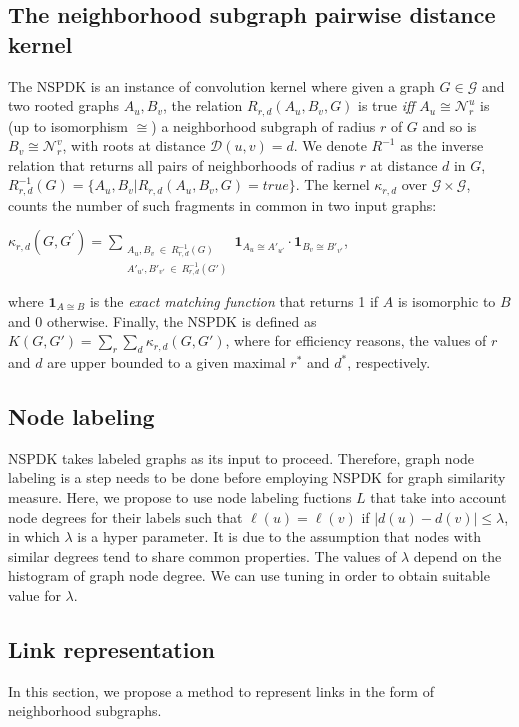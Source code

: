 \documentclass[runningheads,a4paper]{llncs}
\begin{document}
\subsection{The neighborhood subgraph pairwise distance kernel}
The NSPDK \cite{nspdk} is an instance of convolution kernel \cite{convolution-kernel} where given a graph $G \in \mathcal{G}$ and two rooted graphs $A_u, B_v$, the relation $R_{r,d}(A_u, B_v, G)$ is true {\em iff} $A_u \cong \mathcal{N}_r^u$ is (up to isomorphism $\cong$) a neighborhood subgraph of radius $r$ of $G$ and so is $B_v \cong  \mathcal{N}_r^v$, with roots at distance $\mathcal{D}(u,v)= d$. We denote $R^{-1}$ as the inverse relation that returns all pairs of neighborhoods of radius $r$ at distance $d$ in $G$, $R^{-1}_{r,d}(G) = \lbrace A_u, B_v | R_{r,d}(A_u,B_v,G)=true\rbrace$. The kernel $\kappa_{r,d}$ over $\mathcal{G} \times \mathcal{G}$, counts the number of such fragments in common in two input graphs: 
\begin{center}
$\kappa_{r,d}(G,G^{'}) = 
\!\!\!\!\!\!\!\!\!\!\!\! 
\sum\limits_{\substack{A_u, B_v \ \in \ R_{r,d}^{-1}(G) \\ 
{A'}_{u'}, {B'}_{v'} \ \in \ R_{r,d}^{-1}(G')
}} \!\!\!\!\!\!\!\!\!\!\!\!  { { \textbf{1}_{A_{u} \cong A'_{u'}}} \cdot {
\textbf{1}_{B_{v} \cong B'_{v'}}} }$, 
\end{center}
\noindent where $\textbf{1}_{A \cong B}$ is the \textit{exact matching function} that returns 1 if $A$ is
isomorphic to $B$ and 0 otherwise.  Finally, the NSPDK is defined as $K(G,G') = \sum\limits_{r}{\sum\limits_{d}{\kappa_{r,d}(G,G')}}$, where for efficiency reasons, the values of $r$ and $d$ are upper bounded to a given maximal $r^*$ and $d^*$, respectively.

\subsection{Node labeling}
NSPDK takes labeled graphs as its input to proceed. Therefore, graph node labeling is a step needs to be done before employing NSPDK for graph similarity measure. Here, we propose to use node labeling fuctions $L$ that take into account node degrees for their labels such that $\ell(u) = \ell(v)$ if $|d(u) - d(v)|\leq \lambda$, in which $\lambda$ is a hyper parameter. It is due to the assumption that nodes with similar degrees tend to share common properties. The values of $\lambda$ depend on the histogram of graph node degree. We can use tuning in order to obtain suitable value for $\lambda$.
\subsection{Link representation}
In this section, we propose a method to represent links in the form of neighborhood subgraphs.
\end{document}
